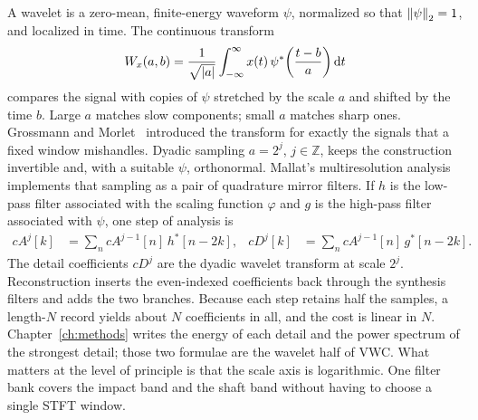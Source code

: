 A wavelet is a zero-mean, finite-energy waveform \(\psi\), normalized so that \(\left\lVert \psi \right\rVert_{2}=1\), and localized in time.
The continuous transform
\begin{equation}
W_{x}(a,b)=\frac{1}{\sqrt{\left\lvert a \right\rvert}}\int_{-\infty}^{\infty} x(t)\,\psi^{*}\!\left(\frac{t-b}{a}\right)\mathrm{d}t
\label{eq:cwt}
\end{equation}
compares the signal with copies of \(\psi\) stretched by the scale \(a\) and shifted by the time \(b\).
Large \(a\) matches slow components; small \(a\) matches sharp ones.
Grossmann and Morlet~\cite{grossmann1984} introduced the transform for exactly the signals that a fixed window mishandles.
Dyadic sampling \(a=2^{j}\), \(j\in\mathbb{Z}\), keeps the construction invertible and, with a suitable \(\psi\), orthonormal.
Mallat's multiresolution analysis~\cite{mallat1989,daubechies1988,newland1993} implements that sampling as a pair of quadrature mirror filters.
If \(h\) is the low-pass filter associated with the scaling function \(\varphi\) and \(g\) is the high-pass filter associated with \(\psi\), one step of analysis is
\begin{align}
cA^{j}[k]&=\sum_{n} cA^{j-1}[n]\,h^{*}[n-2k],&
cD^{j}[k]&=\sum_{n} cA^{j-1}[n]\,g^{*}[n-2k].
\label{eq:mallat}
\end{align}
The detail coefficients \(cD^{j}\) are the dyadic wavelet transform at scale \(2^{j}\).
Reconstruction inserts the even-indexed coefficients back through the synthesis filters and adds the two branches.
Because each step retains half the samples, a length-\(N\) record yields about \(N\) coefficients in all, and the cost is linear in \(N\).
Chapter~\ref{ch:methods} writes the energy of each detail and the power spectrum of the strongest detail; those two formulae are the wavelet half of VWC.
What matters at the level of principle is that the scale axis is logarithmic.
One filter bank covers the impact band and the shaft band without having to choose a single STFT window.

